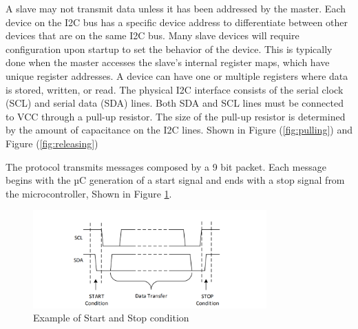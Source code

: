 \documentclass[english]{article}
\begin{document}
A slave may not transmit data unless it has been addressed by the master. 
Each device on the I2C bus has a specific device address to differentiate between
other devices that are on the same I2C bus. Many slave devices will require configuration upon startup to set the behavior of
the device. This is typically done when the master accesses the slave's internal
register maps, which have unique register addresses. A device can have one or
multiple registers where data is stored, written, or read. The physical I2C interface consists of the serial clock (SCL) and serial data (SDA) lines. 
Both SDA and SCL lines must be connected to VCC through a pull-up resistor. The size
of the pull-up resistor is determined by the amount of capacitance on the I2C lines.
Shown in Figure (\ref{fig:pulling}) and Figure (\ref{fig:releasing})
\begin{figure}[!ht]
	\centering
	\caption{}
\end{figure}
\newpage
The protocol transmits messages composed by a 9 bit packet. Each message begins with
 the µC generation of a start signal and ends with a stop signal from the microcontroller,
 Shown in Figure \ref{fig:Stop}.
 \begin{figure}[!h]
	\centering
	\includegraphics[width=0.80\textwidth,]{figures/Start-Stop.png}
	\caption{Example of Start and Stop condition}
	\label{fig:Stop}
\end{figure}
\end{document}
